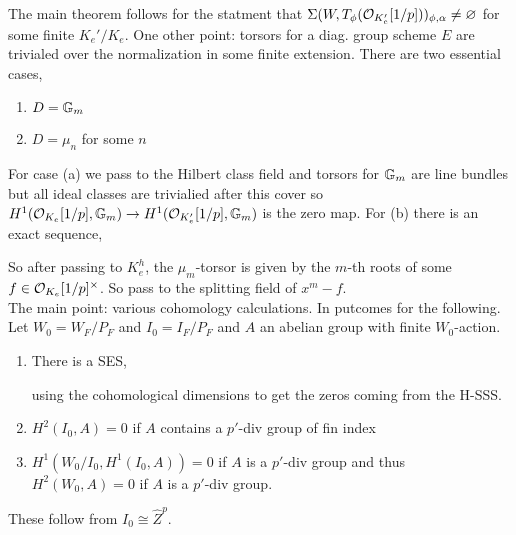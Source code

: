 \documentclass[12pt]{article}
\begin{document}
The main theorem follows for the statment that $\Sigma(W, T_\phi(\mathcal{O}_{K_e'}[1/p]))_{\phi, \alpha} \neq \varnothing$ for some finite $K_e' / K_e$. One other point: torsors for a diag. group scheme $E$ are trivialed over the normalization in some finite extension. There are two essential cases,
\begin{enumerate}
\item $D = \mathbb{G}_m$ 
\item $D = \mu_n$ for some $n$
\end{enumerate}

For case (a) we pass to the Hilbert class field and torsors for $\mathbb{G}_m$ are line bundles but all ideal classes are trivialied after this cover so $H^1(\mathcal{O}_{K_e}[1/p], \mathbb{G}_m) \to H^1(\mathcal{O}_{K_e'}[1/p], \mathbb{G}_m)$ is the zero map. For (b) there is an exact sequence,
\begin{center}
\end{center}
So after passing to $K_e^h$, the $\mu_m$-torsor is given by the $m$-th roots of some $f \in \mathcal{O}_{K_e}[1/p]^\times$. So pass to the splitting field of $x^m - f$. 
\bigskip\\
The main point: various cohomology calculations. In putcomes for the following. Let $W_0 = W_F / P_F$ and $I_0 = I_F / P_F$ and $A$ an abelian group with finite $W_0$-action. 
\begin{enumerate}
\item There is a SES,
\begin{center}
\end{center}
using the cohomological dimensions to get the zeros coming from the H-SSS.
\item $H^2(I_0, A) = 0$ if $A$ contains a $p'$-div group of fin index
\item $H^1(W_0/I_0, H^1(I_0, A)) = 0$ if $A$ is a $p'$-div group and thus $H^2(W_0, A) = 0$ if $A$ is a $p'$-div group.
\end{enumerate}

\begin{rmk}
These follow from $I_0 \cong \hat{Z}^p$. 
\end{rmk}
\end{document}

